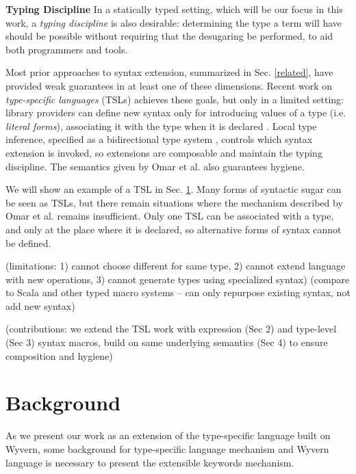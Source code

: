 \documentclass{sig-alternate}
\begin{document}
\noindent
\textbf{Typing Discipline} In a statically typed setting, which will be our focus in this work, a \emph{typing discipline} is also desirable: determining the type a term will have should be possible without requiring that the desugaring be performed, to aid both programmers and tools. 

Most prior approaches to syntax extension, summarized in Sec. \ref{related}, have provided weak guarantees in at least one of these dimensions. Recent work on \emph{type-specific languages} (TSLs) achieves these goals, but only in a limited setting: library providers can define new syntax only for introducing values of a type (i.e. \emph{literal forms}), associating it with the type when it is declared \cite{TSLs}. Local type inference, specified as a bidirectional type system \cite{Pierce:2000:LTI:345099.345100}, controls which syntax extension is invoked, so extensions are composable and maintain the typing discipline. The semantics given by Omar et al. also guarantees hygiene. 

We will show an example of a TSL in Sec. \ref{background}. Many forms of syntactic sugar can be seen as TSLs, but there remain situations where the mechanism described by Omar et al. remains insufficient. Only one TSL can be associated with a type, and only at the place where it is declared, so alternative forms of syntax cannot be defined. 

(limitations: 1) cannot choose different for same type, 2) cannot extend language with new operations, 3) cannot generate types using specialized syntax) (compare to Scala and other typed macro systems -- can only repurpose existing syntax, not add new syntax)

(contributions: we extend the TSL work with expression (Sec 2) and type-level (Sec 3) syntax macros, build on same underlying semantics (Sec 4) to ensure composition and hygiene)

\section{Background}\label{background}
As we present our work as an extension of the type-specific language built on Wyvern, some background for type-specific language mechanism and Wyvern language is necessary to present the extensible keywords mechanism. 
\end{document}
